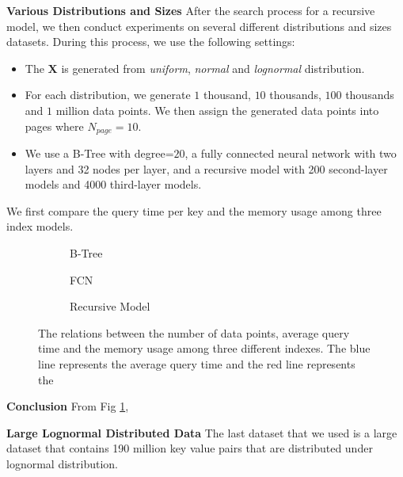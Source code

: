 \textbf{Various Distributions and Sizes} After the search process for a recursive model, we then conduct experiments on several different distributions and sizes datasets. During this process, we use the following settings:

\begin{itemize}
	\item The $\boldsymbol{X}$ is generated from \textit{uniform}, \textit{normal} and \textit{lognormal} distribution.
	\item For each distribution, we generate $1$ thousand, $10$ thousands, $100$ thousands and $1$ million data points. We then assign the generated data points into pages where $N_{page}=10$.
	\item We use a B-Tree with degree=$20$, a fully connected neural network with two layers and 32 nodes per layer, and a recursive model with 200 second-layer models and 4000 third-layer models.
\end{itemize}

We first compare the query time per key and the memory usage among three index models.

	\begin{figure}
     \centering
     \begin{subfigure}[b]{0.28\textwidth}
         \centering
         
         \caption{B-Tree}
         \label{fig:exp2_btree}
     \end{subfigure}
     \hfill
     \begin{subfigure}[b]{0.28\textwidth}
         \centering
         
         \caption{FCN}
         \label{fig:exp2_fcn}
     \end{subfigure}
     \hfill
     \begin{subfigure}[b]{0.28\textwidth}
         \centering
         
         \caption{Recursive Model}
         \label{fig:exp2_rmi}
     \end{subfigure}
        \caption{The relations between the number of data points, average query time and the memory usage among three different indexes. The blue line represents the average query time and the red line represents the }
        \label{fig:exp2}
\end{figure}

\textbf{Conclusion} From Fig \ref{fig:exp2_btree}, 

\textbf{Large Lognormal Distributed Data} The last dataset that we used is a large dataset that contains 190 million key value pairs that are distributed under lognormal distribution.